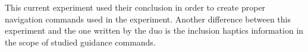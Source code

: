 

\FloatBarrier

This current experiment used their conclusion in order to create proper navigation commands used in the experiment. Another difference between this experiment and the one written by the duo is the inclusion haptics information in the scope of studied guidance commands.